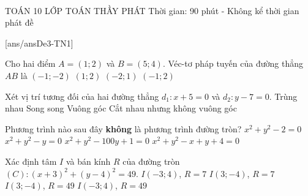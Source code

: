 ﻿﻿﻿\begin{name}
	{\tenchude}
	{TOÁN 10}
	{LỚP TOÁN THẦY PHÁT}
	{Thời gian: 90 phút - Không kể thời gian phát đề}
\end{name}
\TN
{}[ans/ansDe3-TN1]
\begin{ex}%
	Cho hai điểm $A=\left( 1;2 \right)$ và $B=\left( 5;4 \right)$. Véc-tơ pháp tuyến của đường thẳng $AB$ là
	\choice
	{$\left( -1;-2 \right)$}
	{$\left( 1;2 \right)$}
	{$\left( -2;1 \right)$}
	{\True $\left( -1;2 \right)$}
\end{ex}

\begin{ex}%
	Xét vị trí tương đối của hai đường thẳng $d_1\colon x+5=0$ và $d_2\colon y-7=0$.
	\choice
	{Trùng nhau}
	{Song song}
	{\True Vuông góc}
	{Cắt nhau nhưng không vuông góc}
\end{ex}

\begin{ex}%
	Phương trình nào sau đây \textbf{không} là phương trình đường tròn?
	\choice
	{\True $x^2+y^2-2=0$}
	{$x^2+y^2-y=0$}
	{$x^2+y^2-100y+1=0$}
	{$x^2+y^2-x+y+4=0$}
\end{ex}

\begin{ex}%
	Xác định tâm $I$ và bán kính $R$ của đường tròn $(C)\colon (x+3)^2+(y-4)^2=49$.
	\choice
	{\True $I(-3;4)$, $R=7$}
	{$I(3;-4)$, $R=7$}
	{$I(3;-4)$, $R=49$}
	{$I(-3;4)$, $R=49$}
\end{ex}

